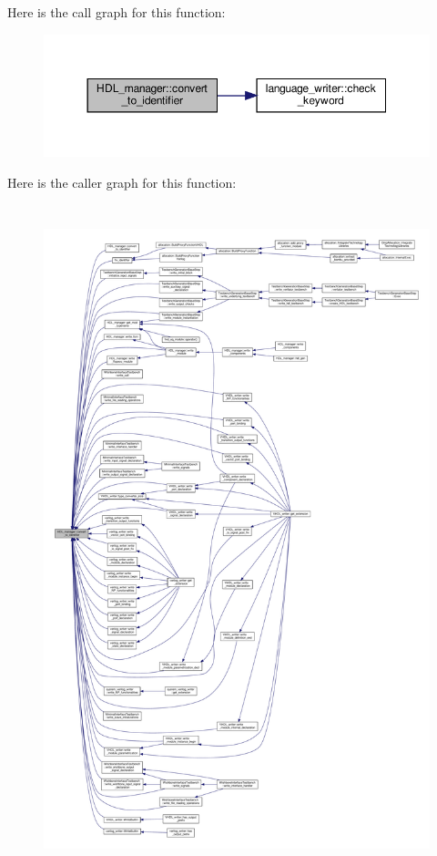 Here is the call graph for this function\+:
\nopagebreak
\begin{figure}[H]
\begin{center}
\leavevmode
\includegraphics[width=350pt]{d7/d32/classHDL__manager_a4e2cbf9a5efaf0260a29e64ec3906500_cgraph}
\end{center}
\end{figure}
Here is the caller graph for this function\+:
\nopagebreak
\begin{figure}[H]
\begin{center}
\leavevmode
\includegraphics[height=550pt]{d7/d32/classHDL__manager_a4e2cbf9a5efaf0260a29e64ec3906500_icgraph}
\end{center}
\end{figure}
\mbox{\label{classHDL__manager_a17d23ec3794851853505d45852d9af72}} 
